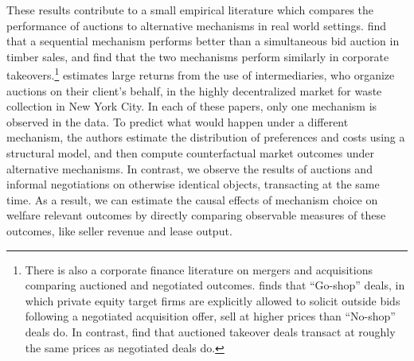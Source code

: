 \documentclass[12pt]{article}
\begin{document}
These results contribute to a small empirical literature which compares the performance of auctions to alternative mechanisms in real world settings. \cite{roberts_when_2013} find that a sequential mechanism performs better than a simultaneous bid auction in timber sales, and \cite{gentry2018entry} find that the two mechanisms perform similarly in corporate takeovers.\footnote{There is also a corporate finance literature on mergers and acquisitions comparing auctioned and negotiated outcomes. \cite{subramanian_go-shops_2007} finds that ``Go-shop'' deals, in which private equity target firms are explicitly allowed to solicit outside bids following a negotiated acquisition offer, sell at higher prices than ``No-shop'' deals do. In contrast, \cite{boone_how_2007} find that auctioned takeover deals transact at roughly the same prices as negotiated deals do.} \cite{salz_intermediation_2017} estimates large returns from the use of intermediaries, who organize auctions on their client's behalf, in the highly decentralized market for waste collection in New York City. In each of these papers, only one mechanism is observed in the data.  To predict what would happen under a different mechanism, the authors estimate the distribution of preferences and costs using a structural model, and then compute counterfactual market outcomes under alternative mechanisms.  In contrast, we observe the results of auctions and informal negotiations on otherwise identical objects, transacting at the same time.  As a result, we can estimate the causal effects of mechanism choice on welfare relevant outcomes by directly comparing observable measures of these outcomes, like seller revenue and lease output. 
\end{document}
